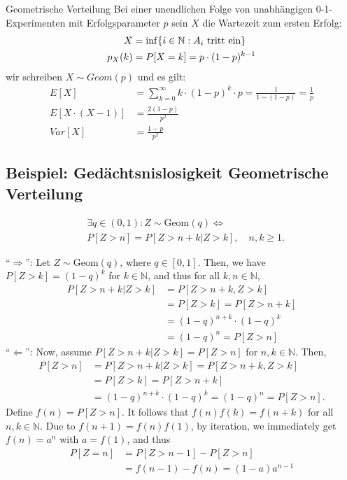 \begin{definition}{Geometrische Verteilung}
Bei einer unendlichen Folge von unabhängigen 0-1-Experimenten mit
Erfolgsparameter $p$ sein $X$ die Wartezeit zum ersten Erfolg:
\begin{align*}
  X       & = \inf \{ i \in \mathbb{N} : A_i \text{ tritt ein} \} \\
  p_X (k) & = P[X = k] = p \cdot  (1-p)^{k-1}
\end{align*}
wir schreiben $X \sim Geom (p)$ und es gilt:
\begin{align*}
  E[X]              & = \sum_{k = 0}^\infty  k \cdot (1-p)^k \cdot p
  = \frac{1}{1- (1-p)} = \frac{1}{p}                 \\
  E[X \cdot  (X-1)] & = \frac{2 (1-p)}{p^2}          \\
  Var[X]            & = \frac{1-p}{p^2}
\end{align*}
\end{definition}
\BoxStart{}
\subsection*{Beispiel: Gedächtsnislosigkeit Geometrische Verteilung}
\begin{align*}
  &\exists q \in (0, 1) : Z \sim \text{Geom}(q) \Leftrightarrow \\
  &P[Z > n] = P[Z > n + k | Z > k], \quad n, k \geq 1.
\end{align*}

``$\Rightarrow$'': Let $Z \sim \text{Geom}(q)$, where $q \in [0, 1]$. Then, we have $P[Z > k] = (1 - q)^k$ for $k \in \mathbb{N}$, and thus for all $k, n \in \mathbb{N}$,
\begin{align*}
P[Z > n + k | Z > k] &= P[Z > n + k, Z > k] \\
&= P[Z > k] = P[Z > n + k] \\
&= (1 - q)^{n+k} \cdot (1 - q)^k \\
&= (1 - q)^n = P[Z > n]
\end{align*}
``$\Leftarrow$'': Now, assume $P[Z > n + k | Z > k] = P[Z > n]$ for $n, k \in \mathbb{N}$. Then,
\begin{align*}
P[Z > n] &= P[Z > n + k | Z > k] = P[Z > n + k, Z > k] \\
&= P[Z > k] = P[Z > n + k] \\
&= (1 - q)^{n+k} \cdot (1 - q)^k = (1 - q)^n = P[Z > n].
\end{align*}
Define $f(n) = P[Z > n]$. It follows that $f(n)f(k) = f(n + k)$ for all $n, k \in \mathbb{N}$. Due to $f(n + 1) = f(n)f(1)$, by iteration, we immediately get $f(n) = a^n$ with $a = f(1)$, and thus
\begin{align*}
  P[Z = n] &= P[Z > n - 1] - P[Z > n]\\
  &= f(n - 1) - f(n) = (1 - a)a^{n-1}
\end{align*}

